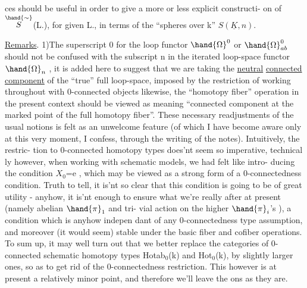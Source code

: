 
ces should be useful in order to give a more or less explicit constructi-%
on of $\overset{\hand{\sim}}{S}$(L.), for given L., in terms of the ``spheres over k''  $S(\underline{K},n)$.

\uline{Remarks}. 1)The superscript 0 for the loop functor $\hand{\Omega}^{0}$ or $\hand{\Omega}^{0}_{ab}$ should
not be confused with the subscript n in the iterated loop-space functor
$\hand{\Omega}_n$ , it is  added here to suggest that we are taking the \uline{neutral}
\uline{connected component} of the ``true'' full loop-space,   imposed by the
restriction of working throughout with 0-connected objects\hand{;} \deleted{--} likewise,
the ``homotopy fiber'' operation in the present context should be viewed
as meaning ``connected component at the marked point of the full homotopy
fiber''. These necessary readjustments of the usual notions is  felt as an
unwelcome feature (of which I have become aware only at this very moment,
I confess, through the writing of the notes). Intuitively, the restric-%
tion to 0-connected  homotopy types does'nt seem so imperative, technical
\hand{-}ly however, when working with  schematic models, we had felt like intro-%
ducing the condition $X_0$=e , which may be viewed as a strong form of a
0-connectedness condition. Truth to tell, it is'nt so clear that this
condition is  going to be of great utility - anyhow, it is'nt enough
to ensure what we're really after at present (namely abelian $\hand{\pi}_1$ and tri-%
vial action on the higher $\hand{\pi}_i$'s ), a condition which is anyhow indepen
dant of any 0-connectedness type assumption, and  moreover (it would
seem) stable under the basic fiber and cofiber operations. To sum up,
it may well turn out that we better replace the categories of 0-connected
schematic homotopy types Hotab$_0$(k) and Hot$_0$(k), by slightly larger ones,
so as to get rid of the 0-connectedness restriction. This however is at
present a relatively minor point, and therefore we'll leave the  
ons as they are.


